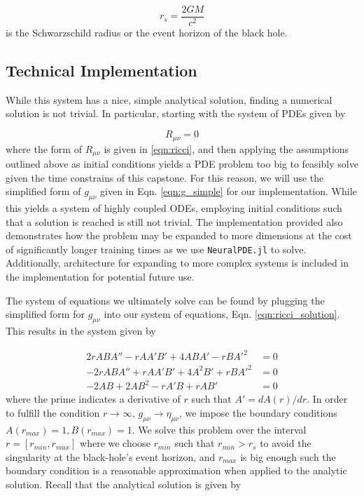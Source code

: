 \documentclass{CUP-JNL-DTM}%
\theoremstyle{definition}
\numberwithin{equation}{section}
\begin{document}
\begin{equation}
    r_s = \frac{2GM}{c^2}
\end{equation}
is the Schwarzschild radius or the event horizon of the black hole. 

\subsection{Technical Implementation}

While this system has a nice, simple analytical solution, finding a numerical solution is not trivial. In particular, starting with the system of PDEs given by

\begin{equation}
    R_{\mu\nu} = 0
    \label{eqn:ricci_solution}
\end{equation}
where the form of $R_{\mu\nu}$ is given in \ref{eqn:ricci}, and then applying the assumptions outlined above as initial conditions yields a PDE problem too big to feasibly solve given the time constrains of this capstone. For this reason, we will use the simplified form of $g_{\mu\nu}$ given in Eqn. \ref{eqn:g_simple} for our implementation. While this yields a system of highly coupled ODEs, employing initial conditions such that a solution is reached is still not trivial. The implementation provided also demonstrates how the problem may be expanded to more dimensions at the cost of significantly longer training times as we use \texttt{NeuralPDE.jl} to solve. Additionally, architecture for expanding to more complex systems is included in the implementation for potential future use. 

The system of equations we ultimately solve can be found by plugging the simplified form for $g_{\mu\nu}$ into our system of equations, Eqn. \ref{eqn:ricci_solution}. This results in the system given by 

\begin{equation}
\begin{split}
    2rABA'' - rAA'B' + 4ABA' - rBA'^2 & = 0 \\
    -2rABA'' + rAA'B' + 4A^2B' + rBA'^2 & = 0 \\ 
    -2AB + 2AB^2 - rA'B + rAB' & = 0
    \label{eqn:einstein_ODEs}
\end{split}
\end{equation}
where the prime indicates a derivative of $r$ such that $A' = dA(r)/dr$. In order to fulfill the condition $r \rightarrow \infty$, $g_{\mu\nu} \rightarrow \eta_{\mu\nu}$, we impose the boundary conditions $A(r_{max}) = 1, B(r_{max}) = 1$. We solve this problem over the interval $r = [r_{min}, r_{max}]$ where we choose $r_{min}$ such that $r_{min} > r_s$ to avoid the singularity at the black-hole's event horizon, and $r_{max}$ is big enough such the boundary condition is a reasonable approximation when applied to the analytic solution. Recall that the analytical solution is given by 
\end{document}

